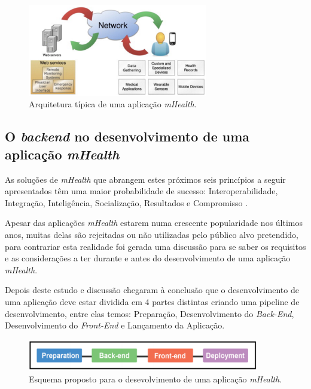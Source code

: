 \begin{figure}[H]
  \centering
  \includegraphics[width=0.7\textwidth]{imgs/mHealthArch.png}
  \caption[Arquitetura t\'ipica de uma  aplica\c c\~ao \textit{mHealth}]{Arquitetura t\'ipica de uma  aplica\c c\~ao \textit{mHealth}. \cite{mhealth}}
  
  \label{f:mhealtharch}
\end{figure}



\subsection{O \textit{backend} no desenvolvimento de uma aplica\c c\~ao \textit{mHealth}}
As solu\c c\~oes de \textit{mHealth} que abrangem estes pr\'oximos seis princ\'ipios a seguir apresentados t\^em uma maior probabilidade de sucesso: Interoperabilidade, Integra\c c\~ao, Intelig\^encia, Socializa\c c\~ao, Resultados e Compromisso \cite{mhealthinsights}.
\par
Apesar das aplica\c c\~oes \textit{mHealth} estarem numa crescente popularidade nos \'ultimos anos, muitas delas s\~ao rejeitadas ou n\~ao utilizadas pelo p\'ublico alvo pretendido, para contrariar esta realidade foi gerada uma discuss\~ao para se saber os requisitos e as considera\c c\~oes a ter durante e antes do desenvolvimento de uma aplica\c c\~ao \textit{mHealth}.
\par
Depois deste estudo e discuss\~ao chegaram \`a conclus\~ao que o desenvolvimento de uma aplica\c c\~ao deve estar dividida em 4 partes distintas criando uma pipeline de desenvolvimento, entre elas temos:  Prepara\c c\~ao, Desenvolvimento do \textit{Back-End}, Desenvolvimento do \textit{Front-End} e Lan\c camento da Aplica\c c\~ao\cite{mhealth-pipeline}.

\begin{figure}[!ht]
  \centering
  \includegraphics[width=0.9\textwidth]{imgs/mhealthDevPipeline.png}
  \caption[Esquema proposto para o desenvolvimento de uma aplica\c c\~ao \textit{mHealth}]{Esquema proposto para o desevolvimento de uma aplica\c c\~ao \textit{mHealth}. \cite{mhealth-pipeline}}
  
  \label{f:mhealthpipeline}
\end{figure}





